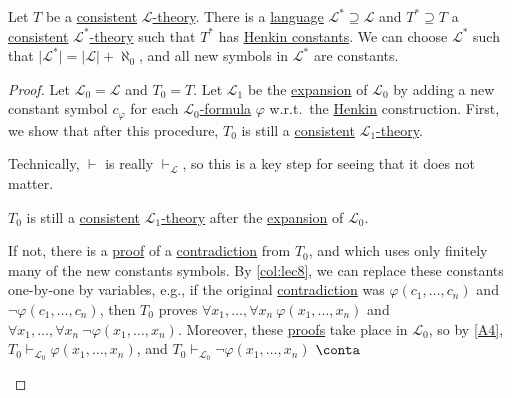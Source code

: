 \begin{theorem}\label{thm:lec8}
	Let \(T\) be a \hyperref[def:consistent]{consistent} \hyperref[def:theory]{\(\mathcal{L} \)-theory}. There is a \hyperref[def:language]{language} \(\mathcal{L} ^{\ast} \supseteq \mathcal{L}\) and \(T^{\ast} \supseteq T\) a \hyperref[def:consistent]{consistent} \hyperref[def:theory]{\(\mathcal{L} ^{\ast} \)-theory} such that \(T^{\ast} \) has \hyperref[def:Henkin-constant]{Henkin constants}. We can choose \(\mathcal{L} ^{\ast} \) such that \(\vert \mathcal{L} ^{\ast} \vert = \vert \mathcal{L} \vert + \aleph _0\), and all new symbols in \(\mathcal{L} ^{\ast} \) are constants.
\end{theorem}
\begin{proof}
	Let \(\mathcal{L} _0 = \mathcal{L} \) and \(T_0 = T\). Let \(\mathcal{L} _1\) be the \hyperref[not:expansion]{expansion} of \(\mathcal{L} _0\) by adding a new constant symbol \(c_{\varphi} \) for each \hyperref[def:formula]{\(\mathcal{L} _0\)-formula} \(\varphi\) w.r.t.\ the \hyperref[def:Henkin-constant]{Henkin} construction. First, we show that after this procedure, \(T_0\) is still a \hyperref[def:consistent]{consistent} \hyperref[def:theory]{\(\mathcal{L} _1\)-theory}.

	\begin{remark}
		Technically, \(\vdash \) is really \(\vdash _{\mathcal{L} }\), so this is a key step for seeing that it does not matter.
	\end{remark}

	\begin{claim}
		\(T_0\) is still a \hyperref[def:consistent]{consistent} \hyperref[def:theory]{\(\mathcal{L} _1\)-theory} after the \hyperref[not:expansion]{expansion} of \(\mathcal{L} _0\).
	\end{claim}
	\begin{explanation}
		If not, there is a \hyperref[def:proof]{proof} of a \hyperref[prop:proof-by-contradiction]{contradiction} from \(T_0\), and which uses only finitely many of the new constants symbols. By \autoref{col:lec8}, we can replace these constants one-by-one by variables, e.g., if the original \hyperref[prop:proof-by-contradiction]{contradiction} was \(\varphi (c_1, \dots , c_n)\) and \(\lnot \varphi (c_1, \dots , c_n)\), then \(T_0\) proves \(\forall x_1, \dots , \forall x_n\ \varphi (x_1, \dots , x_n)\) and \(\forall x_1, \dots , \forall x_n\ \lnot \varphi (x_1, \dots , x_n)\). Moreover, these \hyperref[def:proof]{proofs} take place in \(\mathcal{L} _0\), so by \autoref{A4}, \(T_0 \vdash _{\mathcal{L} _0} \varphi (x_1, \dots , x_n)\), and \(T_0 \vdash _{\mathcal{L} _0} \lnot \varphi (x_1, \dots , x_n)\) \(\conta\)
	\end{explanation}


\end{proof}
